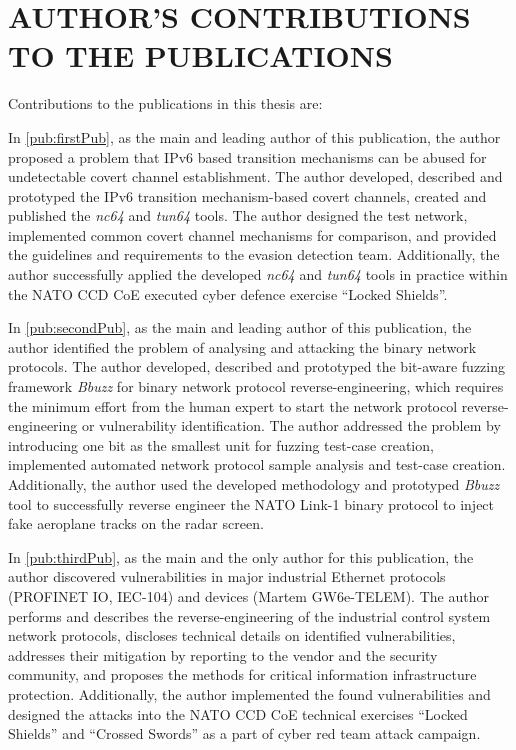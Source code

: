 \section*{AUTHOR'S CONTRIBUTIONS TO THE PUBLICATIONS}  %
Contributions to the publications in this thesis are:
\begin{contriblist}
\item In \ref{pub:firstPub}, as the main and leading author of this publication, the author proposed a problem that IPv6 based transition mechanisms can be abused for undetectable covert channel establishment. The author developed, described and prototyped the IPv6 transition mechanism-based covert channels, created and published the \textit{nc64} and \textit{tun64} tools. The author designed the test network, implemented common covert channel mechanisms for comparison, and provided the guidelines and requirements to the evasion detection team. Additionally, the author successfully applied the developed \textit{nc64} and \textit{tun64} tools in practice within the NATO CCD CoE executed cyber defence exercise ``Locked Shields''.
\item In \ref{pub:secondPub}, as the main and leading author of this publication, the author identified the problem of analysing and attacking the binary network protocols. The author developed, described and prototyped the bit-aware fuzzing framework \textit{Bbuzz} for binary network protocol reverse-engineering, which requires the minimum effort from the human expert to start the network protocol reverse-engineering or vulnerability identification. The author addressed the problem by introducing one bit as the smallest unit for fuzzing test-case creation, implemented automated network protocol sample analysis and test-case creation. Additionally, the author used the developed methodology and prototyped \textit{Bbuzz} tool to successfully reverse engineer the NATO Link-1 binary protocol to inject fake aeroplane tracks on the radar screen.
\item In \ref{pub:thirdPub}, as the main and the only author for this publication, the author discovered vulnerabilities in major industrial Ethernet protocols (PROFINET IO, IEC-104) and devices (Martem GW6e-TELEM). The author performs and describes the reverse-engineering of the industrial control system network protocols, discloses technical details on identified vulnerabilities, addresses their mitigation by reporting to the vendor and the security community, and proposes the methods for critical information infrastructure protection. Additionally, the author implemented the found vulnerabilities and designed the attacks into the NATO CCD CoE technical exercises ``Locked Shields'' and ``Crossed Swords'' as a part of cyber red team attack campaign.

\end{contriblist}
